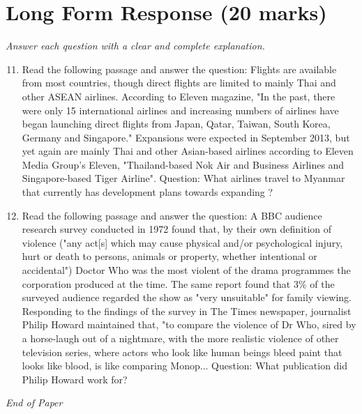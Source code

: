 \documentclass[12pt]{article}
\begin{document}
\section*{Long Form Response (20 marks)}
\textit{Answer each question with a clear and complete explanation.}
\begin{enumerate}[label=\arabic*.]
\setcounter{enumi}{10}
\item Read the following passage and answer the question: Flights are available from most countries, though direct flights are limited to mainly Thai and other ASEAN airlines. According to Eleven magazine, "In the past, there were only 15 international airlines and increasing numbers of airlines have began launching direct flights from Japan, Qatar, Taiwan, South Korea, Germany and Singapore." Expansions were expected in September 2013, but yet again are mainly Thai and other Asian-based airlines according to Eleven Media Group's Eleven, "Thailand-based Nok Air and Business Airlines and Singapore-based Tiger Airline". Question: What airlines travel to Myanmar that currently has development plans towards expanding ?
\item Read the following passage and answer the question: A BBC audience research survey conducted in 1972 found that, by their own definition of violence ("any act[s] which may cause physical and/or psychological injury, hurt or death to persons, animals or property, whether intentional or accidental") Doctor Who was the most violent of the drama programmes the corporation produced at the time. The same report found that 3\% of the surveyed audience regarded the show as "very unsuitable" for family viewing. Responding to the findings of the survey in The Times newspaper, journalist Philip Howard maintained that, "to compare the violence of Dr Who, sired by a horse-laugh out of a nightmare, with the more realistic violence of other television series, where actors who look like human beings bleed paint that looks like blood, is like comparing Monop... Question: What publication did Philip Howard work for?
\end{enumerate}

\vfill
\noindent\textit{End of Paper}
\end{document}
